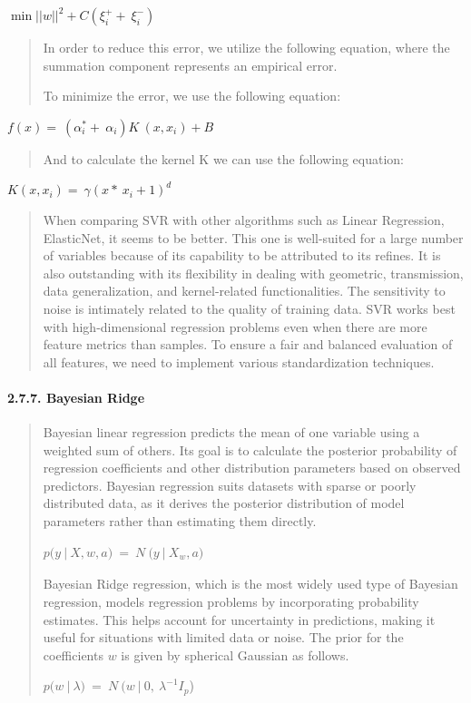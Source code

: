 \documentclass[
]{article}
\begin{document}
\({\min\left| |w| \right|}^{2} + C(\xi_{i}^{+} + \ \xi_{i}^{-})\ \ \)

\begin{quote}
In order to reduce this error, we utilize the following equation, where
the summation component represents an empirical error.

To minimize the error, we use the following equation:
\end{quote}

\(f(x) = \ \left( \alpha_{i}^{*} + \ \alpha_{i} \right)K\ \left( x,x_{i} \right) + B\)

\begin{quote}
And to calculate the kernel K we can use the following equation:
\end{quote}

\(K\left( x,x_{i} \right) = \ \gamma\left( x*\ x_{i} + 1 \right)^{d}\ \)

\begin{quote}
When comparing SVR with other algorithms such as Linear Regression,
ElasticNet, it seems to be better. This one is well-suited for a large
number of variables because of its capability to be attributed to its
refines. It is also outstanding with its flexibility in dealing with
geometric, transmission, data generalization, and kernel-related
functionalities. The sensitivity to noise is intimately related to the
quality of training data. SVR works best with high-dimensional
regression problems even when there are more feature metrics than
samples. To ensure a fair and balanced evaluation of all features, we
need to implement various standardization techniques.
\end{quote}

\hypertarget{bayesian-ridge}{%
\paragraph{\texorpdfstring{\textbf{2.7.7. Bayesian
Ridge}}{2.7.7. Bayesian Ridge}}\label{bayesian-ridge}}

\begin{quote}
Bayesian linear regression predicts the mean of one variable using a
weighted sum of others. Its goal is to calculate the posterior
probability of regression coefficients and other distribution parameters
based on observed predictors. Bayesian regression suits datasets with
sparse or poorly distributed data, as it derives the posterior
distribution of model parameters rather than estimating them directly.

\(p(y\ |\ X,w,a)\  = \ N\ (y\ |\ X_{w}{,a)}_{}\)

Bayesian Ridge regression, which is the most widely used type of
Bayesian regression, models regression problems by incorporating
probability estimates. This helps account for uncertainty in
predictions, making it useful for situations with limited data or noise.
The prior for the coefficients \(w\) is given by spherical Gaussian as
follows.

\(p(w\ |\ \lambda)\  = \ N\ (w\ |\ 0,\ \lambda^{- 1}I_{p}\))
\end{quote}
\end{document}
